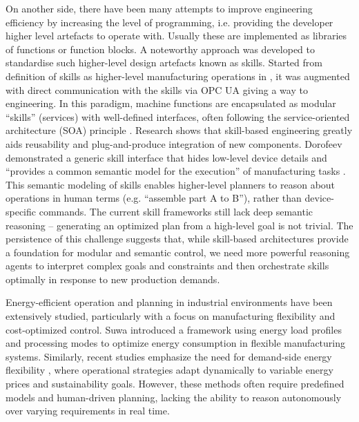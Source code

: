 \begin{bibunit}
    On another side, there have been many attempts to improve engineering efficiency by increasing the level of programming, i.e. providing the developer higher level artefacts to operate with. Usually these are implemented as libraries of functions or function blocks. A noteworthy approach was developed to standardise such higher-level design artefacts known as skills. Started from definition of skills as higher-level manufacturing operations in \cite{pfrommer2013pprs}, it was augmented with direct communication with the skills via OPC UA giving a way to engineering. In this paradigm, machine functions are encapsulated as modular “skills” (services) with well-defined interfaces, often following the service-oriented architecture (SOA) principle \cite{9576342}. Research shows that skill-based engineering greatly aids reusability and plug-and-produce integration of new components. Dorofeev \etal demonstrated a generic skill interface that hides low-level device details and “provides a common semantic model for the execution” of manufacturing tasks \cite{10.1145/3377812.3381394}. This semantic modeling of skills enables higher-level planners to reason about operations in human terms (e.g. “assemble part A to B”), rather than device-specific commands. The current skill frameworks still lack deep semantic reasoning – generating an optimized plan from a high-level goal is not trivial. The persistence of this challenge suggests that, while skill-based architectures provide a foundation for modular and semantic control, we need more powerful reasoning agents to interpret complex goals and constraints and then orchestrate skills optimally in response to new production demands. 
    
    Energy-efficient operation and planning in industrial environments have been extensively studied, particularly with a focus on manufacturing flexibility and cost-optimized control. Suwa \etal \cite{SUWA2016313} introduced a framework using energy load profiles and processing modes to optimize energy consumption in flexible manufacturing systems. Similarly, recent studies emphasize the need for demand-side energy flexibility \cite{VONHAYN2023155}, where operational strategies adapt dynamically to variable energy prices and sustainability goals. However, these methods often require predefined models and human-driven planning, lacking the ability to reason autonomously over varying requirements in real time.
    

\end{bibunit}
